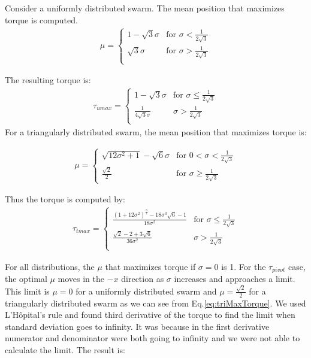 Consider a uniformly distributed swarm. The mean position that maximizes torque is computed.
\begin{align}
\mu=\left\{
\begin{array}{ll}
1-\sqrt{3}\sigma &   \textrm{for     } \sigma < \frac{1}{2\sqrt{3}}\\
\sqrt{3}\sigma &   \textrm{for     } \sigma > \frac{1}{2\sqrt{3}}\\
\end{array} 
\right.
\end{align}

The resulting torque is:
\begin{align}
\tau_{umax} =\left\{
\begin{array}{ll}
1-\sqrt{3}\sigma &   \textrm{for     } \sigma \leq \frac{1}{2\sqrt{3}}\\
\frac{1}{4 \sqrt{3}\sigma} &   \sigma > \frac{1}{2\sqrt{3}}\\
\end{array} 
\right.
\end{align}
For a triangularly distributed swarm, the mean position that maximizes torque is:

\begin{align}
\mu= \left\{
\begin{array}{ll}
 \sqrt{12\sigma^2 +1}  -\sqrt{6}\sigma &   \textrm{for     } 0< \sigma  <\frac{1}{2\sqrt{3}} \\
 \frac{\sqrt{2}}{2} &   \textrm{for     } \sigma \geq \frac{1}{2\sqrt{3}} 
\end{array} 
\right.
\end{align}

Thus the torque is computed by:
\begin{align}\label{eq:triMaxTorque}
\tau_{tmax} =\left\{
\begin{array}{ll}
\frac{(1+12\sigma^2)^{\frac{3}{2}}- 18\sigma^3\sqrt{6}-1}{18\sigma^2} &   \textrm{for     } \sigma \leq \frac{1}{2\sqrt{3}}\\
\frac{\sqrt{2}-2+3\sqrt{6}}{36\sigma^2} &   \sigma > \frac{1}{2\sqrt{3}}\\
\end{array} 
\right.
\end{align}


For all distributions, the $\mu$ that maximizes torque if $\sigma = 0$ is 1. For the $\tau_{pivot}$ case, the optimal $\mu$ moves in the $-x$ direction as $\sigma$ increases and approaches a limit. This limit is $\mu = 0$ for a uniformly distributed swarm and $\mu = \frac{\sqrt{2}}{2}$ for a triangularly distributed swarm as we can see from Eq.\ref{eq:triMaxTorque}. We used L'H\^opital's rule and found third derivative of the torque to find the limit when standard deviation goes to infinity. It was because in the first derivative numerator and denominator were both going to infinity and we were not able to calculate the limit. The result is:

